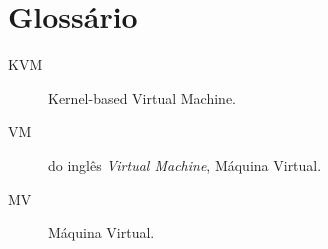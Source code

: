 %
%
\chapter{Glossário}

\begin{description}
\item[KVM] Kernel-based Virtual Machine.
\item[VM] do inglês \emph{Virtual Machine}, Máquina Virtual.
\item[MV] Máquina Virtual.
\end{description}
